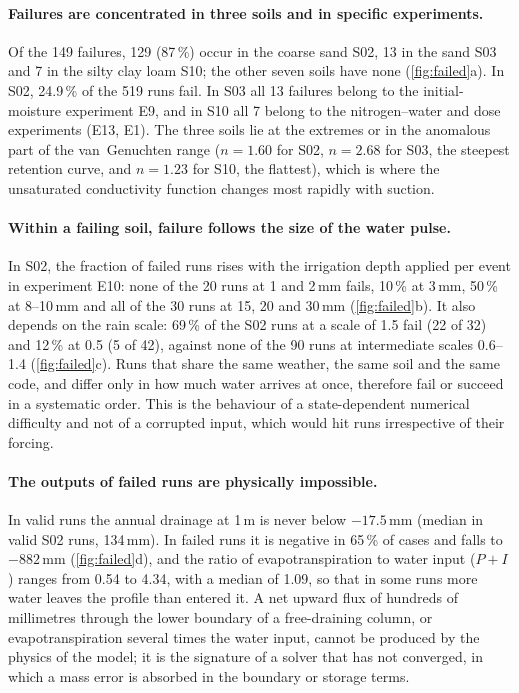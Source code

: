 \documentclass[preprint,12pt,authoryear]{elsarticle}
\begin{document}
\paragraph{Failures are concentrated in three soils and in specific experiments.} Of the 149 failures, 129 (87\,\%) occur in the coarse sand S02, 13 in the sand S03 and 7 in the silty clay loam S10; the other seven soils have none (\cref{fig:failed}a). In S02, 24.9\,\% of the 519 runs fail. In S03 all 13 failures belong to the initial-moisture experiment E9, and in S10 all 7 belong to the nitrogen--water and dose experiments (E13, E1). The three soils lie at the extremes or in the anomalous part of the van~Genuchten range ($n=1.60$ for S02, $n=2.68$ for S03, the steepest retention curve, and $n=1.23$ for S10, the flattest), which is where the unsaturated conductivity function changes most rapidly with suction.

\paragraph{Within a failing soil, failure follows the size of the water pulse.} In S02, the fraction of failed runs rises with the irrigation depth applied per event in experiment E10: none of the 20 runs at 1 and 2\,mm fails, 10\,\% at 3\,mm, 50\,\% at 8--10\,mm and all of the 30 runs at 15, 20 and 30\,mm (\cref{fig:failed}b). It also depends on the rain scale: 69\,\% of the S02 runs at a scale of 1.5 fail (22 of 32) and 12\,\% at 0.5 (5 of 42), against none of the 90 runs at intermediate scales 0.6--1.4 (\cref{fig:failed}c). Runs that share the same weather, the same soil and the same code, and differ only in how much water arrives at once, therefore fail or succeed in a systematic order. This is the behaviour of a state-dependent numerical difficulty and not of a corrupted input, which would hit runs irrespective of their forcing.

\paragraph{The outputs of failed runs are physically impossible.} In valid runs the annual drainage at 1\,m is never below $-17.5$\,mm (median in valid S02 runs, 134\,mm). In failed runs it is negative in 65\,\% of cases and falls to $-882$\,mm (\cref{fig:failed}d), and the ratio of evapotranspiration to water input ($P+I$) ranges from 0.54 to 4.34, with a median of 1.09, so that in some runs more water leaves the profile than entered it. A net upward flux of hundreds of millimetres through the lower boundary of a free-draining column, or evapotranspiration several times the water input, cannot be produced by the physics of the model; it is the signature of a solver that has not converged, in which a mass error is absorbed in the boundary or storage terms.
\end{document}
